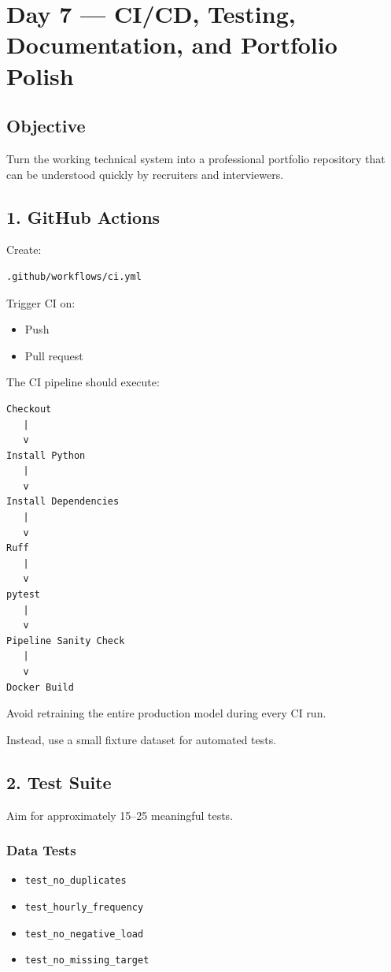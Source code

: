 \documentclass[11pt,a4paper]{article}
\begin{document}
\section{Day 7 --- CI/CD, Testing, Documentation, and Portfolio Polish}

\subsection{Objective}

Turn the working technical system into a professional portfolio repository that can be understood quickly by recruiters and interviewers.

\subsection{1. GitHub Actions}

Create:

\begin{lstlisting}
.github/workflows/ci.yml
\end{lstlisting}

Trigger CI on:

\begin{itemize}
    \item Push
    \item Pull request
\end{itemize}

The CI pipeline should execute:

\begin{verbatim}
Checkout
   |
   v
Install Python
   |
   v
Install Dependencies
   |
   v
Ruff
   |
   v
pytest
   |
   v
Pipeline Sanity Check
   |
   v
Docker Build
\end{verbatim}

Avoid retraining the entire production model during every CI run.

Instead, use a small fixture dataset for automated tests.

\subsection{2. Test Suite}

Aim for approximately 15--25 meaningful tests.

\subsubsection{Data Tests}

\begin{itemize}
    \item \texttt{test\_no\_duplicates}
    \item \texttt{test\_hourly\_frequency}
    \item \texttt{test\_no\_negative\_load}
    \item \texttt{test\_no\_missing\_target}
\end{itemize}
\end{document}
